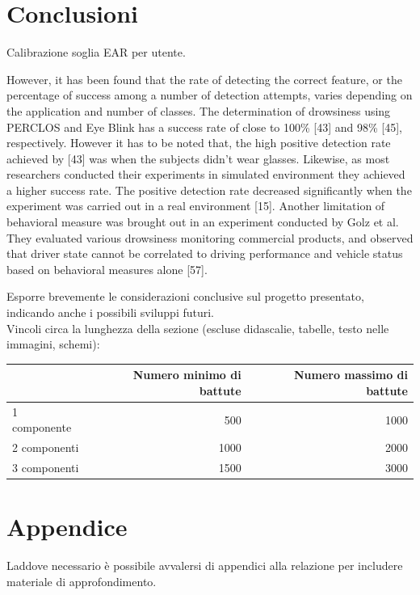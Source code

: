 \documentclass[12pt]{article}
\begin{document}
\section{Conclusioni}

Calibrazione soglia EAR per utente.

However, it has been found that the rate of detecting the correct feature, or the percentage of success among a number of detection attempts, varies depending on the application and number of classes. The determination of drowsiness using PERCLOS and Eye Blink has a success rate of close to 100\% [43] and 98\% [45], respectively. However it has to be noted that, the high positive detection rate achieved by [43] was when the subjects didn’t wear glasses. Likewise, as most researchers conducted their experiments in simulated environment they achieved a higher success rate. The positive detection rate decreased significantly when the experiment was carried out in a real environment [15].
Another limitation of behavioral measure was brought out in an experiment conducted by Golz et al. They evaluated various drowsiness monitoring commercial products, and observed that driver state cannot be correlated to driving performance and vehicle status based on behavioral measures alone [57].

Esporre brevemente le considerazioni conclusive sul progetto presentato, indicando anche i possibili sviluppi futuri.\\

Vincoli circa la lunghezza della sezione (escluse didascalie, tabelle, testo nelle immagini, schemi):

\vspace{1cm}
\begin{tabular}{l|rr}
 & Numero minimo di battute & Numero massimo di battute \\
 \hline
 1 componente & 500 & 1000 \\
 2 componenti & 1000 & 2000 \\
 3 componenti & 1500 & 3000 \\
 \hline
\end{tabular}

\newpage



\appendix
{}
\section*{Appendice}
Laddove necessario è possibile avvalersi di appendici alla relazione per includere materiale di approfondimento.\\
\end{document}
